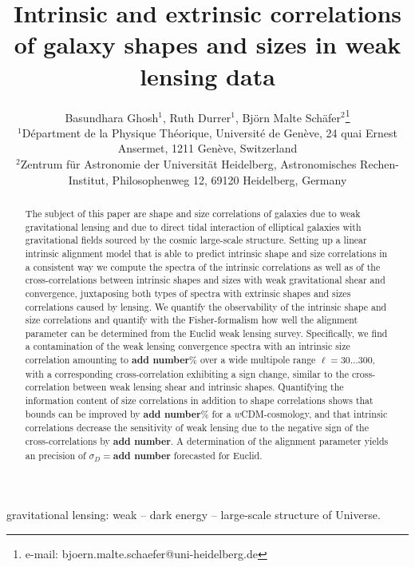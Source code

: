 \documentclass[a4paper,fleqn,usenatbib]{mnras}
\title[Intrinsic sizes and shapes of galaxies]
{Intrinsic and extrinsic correlations of galaxy shapes and sizes in weak lensing data}
\author[B. Ghosh, R. Durrer, B.M. Sch{\"a}fer]
{Basundhara Ghosh$^1$, Ruth Durrer$^1$, Bj{\"o}rn Malte Sch{\"a}fer$^2$\thanks{e-mail: bjoern.malte.schaefer@uni-heidelberg.de}\\
$^1$D{\'e}partment de la Physique Th{\'e}orique, Universit{\'e} de Gen{\`e}ve, 24 quai Ernest Ansermet, 1211 Gen{\`e}ve, Switzerland\\
$^2$Zentrum f{\"u}r Astronomie der Universit{\"a}t Heidelberg, Astronomisches Rechen-Institut, Philosophenweg 12, 69120 Heidelberg, Germany
}
\def\spirou#1{{\bf #1}}
\begin{document}
\pagerange{\pageref{firstpage}--\pageref{lastpage}}
\maketitle
\label{firstpage}


\begin{abstract}
The subject of this paper are shape and size correlations of galaxies due to weak gravitational lensing and due to direct tidal interaction of elliptical galaxies with gravitational fields sourced by the cosmic large-scale structure. Setting up a linear intrinsic alignment model that is able to predict intrinsic shape and size correlations in a consistent way we compute the spectra of the intrinsic correlations as well as of the cross-correlations between intrinsic shapes and sizes with weak gravitational shear and convergence, juxtaposing both types of spectra with extrinsic shapes and sizes correlations caused by lensing. We quantify the observability of the intrinsic shape and size correlations and quantify with the Fisher-formalism how well the alignment parameter can be determined from the Euclid weak lensing survey. Specifically, we find a contamination of the weak lensing convergence spectra with an intrinsic size correlation amounting to \spirou{add number}\% over a wide multipole range $\ell=30\ldots300$, with a corresponding cross-correlation exhibiting a sign change, similar to the cross-correlation between weak lensing shear and intrinsic shapes. Quantifying the information content of size correlations in addition to shape correlations shows that bounds can be improved by \spirou{add number}\% for a $w$CDM-cosmology, and that intrinsic correlations decrease the sensitivity of weak lensing due to the negative sign of the cross-correlations by \spirou{add number}. A determination of the alignment parameter yields an precision of $\sigma_D=$\spirou{add number} forecasted for Euclid.
\end{abstract}


\begin{keywords}
gravitational lensing: weak -- dark energy -- large-scale structure of Universe.
\end{keywords}


\end{document}

